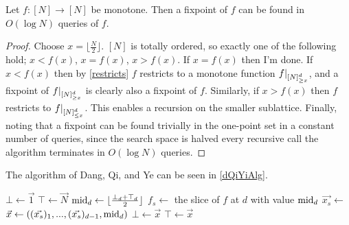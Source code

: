 \begin{lemma}\label{d1Case}
  Let $f : [N] \to [N]$ be monotone. Then a fixpoint of $f$ can be found in $O(\log N)$ queries of $f$.
\end{lemma}
\begin{proof}
  Choose $x = \lfloor \frac{N}{2} \rfloor$. $[N]$ is totally ordered, so exactly one of the following hold; $x < f(x)$, $x = f(x)$, $x > f(x)$.
  If $x = f(x)$ then I'm done. If $x < f(x)$ then by \cref{restricts} $f$ restricts to a monotone function $\restr{f}{[N]^d_{\geq x}}$, 
  and a fixpoint of $\restr{f}{[N]^d_{\geq x}}$ is clearly also a fixpoint of $f$. Similarly, if $x > f(x)$ then $f$ restricts to
  $\restr{f}{[N]^d_{\leq x}}$. This enables a recursion on the smaller sublattice. Finally,
  noting that a fixpoint can be found trivially in the one-point set in a constant number of queries,
  since the search space is halved every recursive call
  the algorithm terminates in $O(\log N)$ queries.
\end{proof}
The algorithm of Dang, Qi, and Ye can be seen in \cref{dQiYiAlg}.

\begin{algorithm}[h]
  \caption{\citep{dangQiYe}}\label{dQiYiAlg}
  \begin{algorithmic}[1]
    \State $\bot \gets \vec{1}$
    \State $\top \gets \vec{N}$
    \State \Return {}
  \EndProcedure
    \State $\text{mid}_d \gets \lfloor \frac{\bot_d + \top_d}{2} \rfloor$
    \State $f_s \gets$ the slice of $f$ at $d$ with value $\text{mid}_d$
    \State $\vec{x_s} \gets$ 
    \State $\vec{x} \gets ((\vec{x_s})_1, ..., (\vec{x_s})_{d-1}, \text{mid}_d)$
      \State {}
    \EndIf
      \State $\bot \gets \vec{x}$
    \EndIf
      \State $\top \gets \vec{x}$
    \EndIf
  \EndWhile
  \EndProcedure
  \end{algorithmic}
\end{algorithm}

